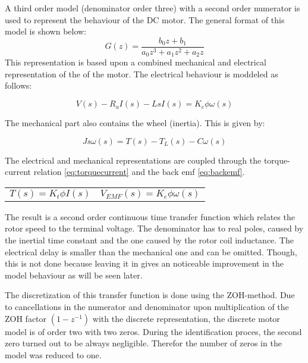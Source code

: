 \documentclass[a4paper]{article}
\newcommand{\newpar}{\vspace{.3cm}\noindent}
\begin{document}
A third order model (denominator order three) with a second order numerator is used to represent the behaviour of the DC motor. The general format of this model is shown below:
\begin{equation}
    G(z)=\frac{b_{0} z+b_{1}}{a_0 z^{3}+a_{1} z^{2}+a_{2} z}
    \label{eq:model}
\end{equation}
This representation is based upon a combined mechanical and electrical representation of the  of the motor. The electrical behaviour is moddeled as follows:

\begin{equation}
    V(s)-R_{a} I(s)-L s I(s)=K_{e} \phi \omega(s)
    \label{eq:electrical}
\end{equation}

\newpar
The mechanical part also contains the wheel (inertia). This is given by:

\begin{equation}
    J s \omega(s)=T(s)-T_{L}(s)-C \omega(s)
    \label{eq:mech}
\end{equation}

\newpar
The electrical and mechanical representations are coupled through the torque-current relation \autoref{eq:torquecurrent} and the back emf \autoref{eq:backemf}.
\begin{center}
    \begin{tabular}{p{5cm}p{5cm}}
        \begin{equation}
            T(s)=K_{t} \phi I(s)
            \label{eq:torquecurrent}
        \end{equation}
        &  
        \begin{equation}
            V_{EMF}(s)=K_{e} \phi \omega(s)
            \label{eq:backemf}
        \end{equation}
        
    \end{tabular}
\end{center}

\newpar
The result is a second order continuous time transfer function which relates the rotor speed to the terminal voltage. The denominator has to real poles, caused by the inertial time constant and the one caused by the rotor coil inductance. The electrical delay is smaller than the mechanical one and can be omitted. Though, this is not done because leaving it in gives an noticeable improvement in the model behaviour as will be seen later.

\newpar
The discretization of this transfer function is done using the ZOH-method. Due to cancellations in the numerator and denominator upon multiplication of the ZOH factor \((1-z^{-1})\) with the discrete representation, the discrete motor model is of order two with two zeros. During the identification proces, the second zero turned out to be always negligible. Therefor the number of zeros in the model was reduced to one. 
\end{document}
